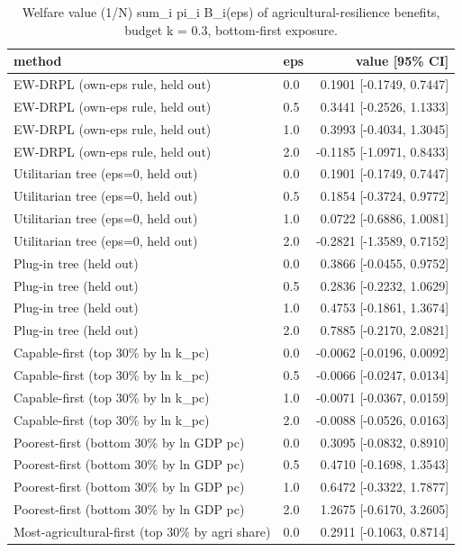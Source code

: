 \begin{table}[htbp]
\centering
\caption{Welfare value (1/N) sum\_i pi\_i B\_i(eps) of agricultural-resilience benefits, budget k = 0.3, bottom-first exposure.}
\label{tab:agri_policy_values}
\begin{tabular}{llr}
\toprule
method & eps & value [95\% CI] \\
\midrule
EW-DRPL (own-eps rule, held out) & 0.0 & 0.1901 [-0.1749, 0.7447] \\
EW-DRPL (own-eps rule, held out) & 0.5 & 0.3441 [-0.2526, 1.1333] \\
EW-DRPL (own-eps rule, held out) & 1.0 & 0.3993 [-0.4034, 1.3045] \\
EW-DRPL (own-eps rule, held out) & 2.0 & -0.1185 [-1.0971, 0.8433] \\
Utilitarian tree (eps=0, held out) & 0.0 & 0.1901 [-0.1749, 0.7447] \\
Utilitarian tree (eps=0, held out) & 0.5 & 0.1854 [-0.3724, 0.9772] \\
Utilitarian tree (eps=0, held out) & 1.0 & 0.0722 [-0.6886, 1.0081] \\
Utilitarian tree (eps=0, held out) & 2.0 & -0.2821 [-1.3589, 0.7152] \\
Plug-in tree (held out) & 0.0 & 0.3866 [-0.0455, 0.9752] \\
Plug-in tree (held out) & 0.5 & 0.2836 [-0.2232, 1.0629] \\
Plug-in tree (held out) & 1.0 & 0.4753 [-0.1861, 1.3674] \\
Plug-in tree (held out) & 2.0 & 0.7885 [-0.2170, 2.0821] \\
Capable-first (top 30\% by ln k\_pc) & 0.0 & -0.0062 [-0.0196, 0.0092] \\
Capable-first (top 30\% by ln k\_pc) & 0.5 & -0.0066 [-0.0247, 0.0134] \\
Capable-first (top 30\% by ln k\_pc) & 1.0 & -0.0071 [-0.0367, 0.0159] \\
Capable-first (top 30\% by ln k\_pc) & 2.0 & -0.0088 [-0.0526, 0.0163] \\
Poorest-first (bottom 30\% by ln GDP pc) & 0.0 & 0.3095 [-0.0832, 0.8910] \\
Poorest-first (bottom 30\% by ln GDP pc) & 0.5 & 0.4710 [-0.1698, 1.3543] \\
Poorest-first (bottom 30\% by ln GDP pc) & 1.0 & 0.6472 [-0.3322, 1.7877] \\
Poorest-first (bottom 30\% by ln GDP pc) & 2.0 & 1.2675 [-0.6170, 3.2605] \\
Most-agricultural-first (top 30\% by agri share) & 0.0 & 0.2911 [-0.1063, 0.8714] \\

\end{tabular}
\end{table}
